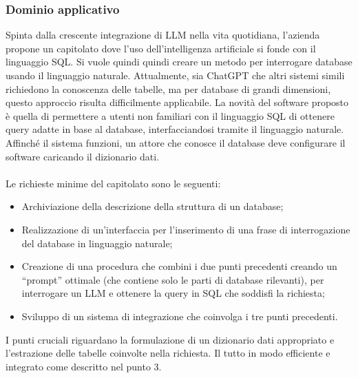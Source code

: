 \subsubsection{Dominio applicativo}
Spinta dalla crescente integrazione di LLM nella vita quotidiana, l’azienda propone un capitolato dove l’uso dell’intelligenza artificiale si fonde con il linguaggio SQL. Si vuole quindi quindi creare un metodo per interrogare database usando il linguaggio naturale. Attualmente, sia ChatGPT che altri sistemi simili richiedono la conoscenza delle tabelle, ma per database di grandi dimensioni, questo approccio risulta difficilmente applicabile. La novità del software proposto è quella di permettere a utenti non familiari con il linguaggio SQL di ottenere query adatte in base al database, interfacciandosi tramite il linguaggio naturale. \\
Affinché il sistema funzioni, un attore che conosce il database deve configurare il software caricando il dizionario dati.\\
\\ 
Le richieste minime del capitolato sono le seguenti:
\begin{itemize}
  \item Archiviazione della descrizione della struttura di un database;
  \item Realizzazione di un’interfaccia per l’inserimento di una frase di interrogazione del database in linguaggio naturale;
  \item Creazione di una procedura che combini i due punti precedenti creando un “prompt” ottimale (che contiene solo le parti di database rilevanti), per interrogare un LLM e ottenere la query in SQL che soddisfi la richiesta;
  \item Sviluppo di un sistema di integrazione che coinvolga i tre punti precedenti.
\end{itemize}
I punti cruciali riguardano la formulazione di un dizionario dati appropriato e l’estrazione delle tabelle coinvolte nella richiesta. Il tutto in modo efficiente e integrato come descritto nel punto 3. 

